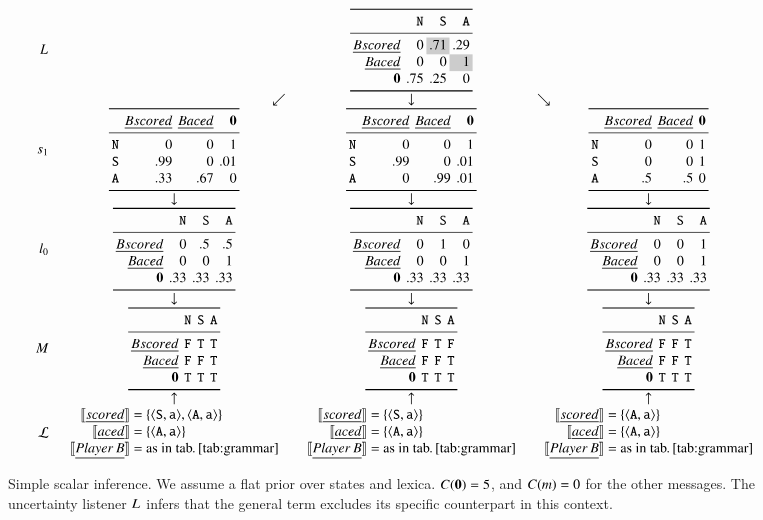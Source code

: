 \documentclass[leqno,12pt]{article}
\begin{document}
\begin{figure}[!t]
  \[
  \setlength{\arraycolsep}{5pt}
  \begin{array}{r c c c}
    \UncertaintyListener &
    & \genericscalar{0}{\graycell{.71}}{.29}{0}{0}{\graycell{1}}{.75}{.25}{0}
    \\
    & \multicolumn{1}{r}{\swarrow}& \multicolumn{1}{c}{\downarrow}& \multicolumn{1}{l}{\searrow}
    \\
    \speakerOne
    &
    \scalarspeaker{0}{0}{1}{.99}{0}{.01}{.33}{.67}{0}
    &
    \scalarspeaker{0}{0}{1}{.99}{0}{.01}{0}{.99}{.01}
    &
    \scalarspeaker{0}{0}{1}{0}{0}{1}{.5}{.5}{0}
    \\
    & \downarrow & \downarrow & \downarrow
    \\
    \listenerZero
    &
    \genericscalar{0}{.5}{.5}{0}{0}{1}{.33}{.33}{.33}
    &
    \genericscalar{0}{1}{0}{0}{0}{1}{.33}{.33}{.33}
    &
    \genericscalar{0}{0}{1}{0}{0}{1}{.33}{.33}{.33}
    \\
    & \downarrow & \downarrow & \downarrow 
    \\    
    \Messages
    &
    \genericscalar{\False}{\True}{\True}{\False}{\False}{\True}{\True}{\True}{\True}
    &
    \genericscalar{\False}{\True}{\False}{\False}{\False}{\True}{\True}{\True}{\True}
    &
    \genericscalar{\False}{\False}{\True}{\False}{\False}{\True}{\True}{\True}{\True}
    \\
    & \uparrow & \uparrow & \uparrow 
    \\                               
    \Lex
    & 
    \scalarlex{\tuple{\world{S},\playera}, \tuple{\world{A},\playera}}
    & 
    \scalarlex{\tuple{\world{S},\playera}}
    &
    \scalarlex{\tuple{\world{A},\playera}}   
  \end{array}
  \]
  \caption{Simple scalar inference. 
    We assume a flat prior over states and lexica. 
    $C(\mathbf{0}) = 5$, and $C(m) = 0$ for the other messages. 
    The uncertainty listener $L_{}$ infers that the general term 
     excludes its specific counterpart  in this context.}
  \label{fig:simplescalar}
\end{figure}

\end{document}

